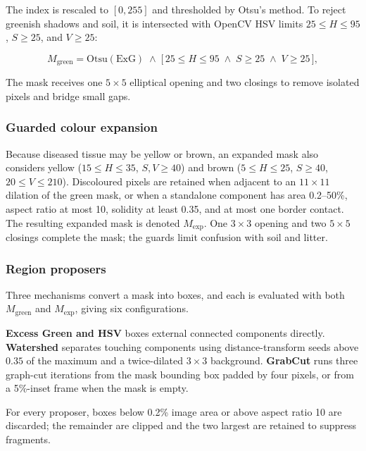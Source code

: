 \documentclass[a4paper,8pt]{article}
\begin{document}
The index is rescaled to $[0,255]$ and thresholded by Otsu's method. To reject greenish shadows
and soil, it is intersected with OpenCV HSV limits $25\le H\le95$, $S\ge25$, and $V\ge25$:

\begin{equation}
M_{\mathrm{green}} = \mathrm{Otsu}\!\left(\mathrm{ExG}\right) \;\wedge\;
\bigl[\, 25 \le H \le 95 \;\wedge\; S \ge 25 \;\wedge\; V \ge 25 \,\bigr],
\label{eq:greenmask}
\end{equation}

The mask receives one $5\times5$ elliptical opening and two closings to remove isolated pixels
and bridge small gaps.

\subsubsection{Guarded colour expansion}
\label{sec:expanded-mask}

Because diseased tissue may be yellow or brown, an expanded mask also considers yellow
($15\le H\le35$, $S,V\ge40$) and brown ($5\le H\le25$, $S\ge40$, $20\le V\le210$).
Discoloured pixels are retained when adjacent to an $11\times11$ dilation of the green mask, or
when a standalone component has area 0.2--50\%, aspect ratio at most 10, solidity at least 0.35,
and at most one border contact. The resulting expanded mask is denoted $M_{\mathrm{exp}}$.
One $3\times3$ opening and two $5\times5$ closings complete the
mask; the guards limit confusion with soil and litter.

\subsubsection{Region proposers}
\label{sec:proposers}

Three mechanisms convert a mask into boxes, and each is evaluated with both
$M_{\mathrm{green}}$ and $M_{\mathrm{exp}}$, giving six configurations.

\textbf{Excess Green and HSV} boxes external connected components directly. \textbf{Watershed}
separates touching components using distance-transform seeds above $0.35$ of the maximum and a
twice-dilated $3\times3$ background. \textbf{GrabCut} runs three graph-cut iterations from the
mask bounding box padded by four pixels, or from a 5\%-inset frame when the mask is empty.

For every proposer, boxes below 0.2\% image area or above aspect ratio 10 are discarded; the
remainder are clipped and the two largest are retained to suppress fragments.
\end{document}
